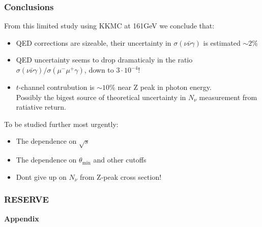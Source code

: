 \documentclass{beamer}
\begin{document}
\begin{frame}[fragile]
\frametitle{\bf Conclusions}
\small
From this limited study using KKMC at 161GeV we conclude that:
\begin{itemize}
\item
QED corrections are sizeable,
their uncertainty in $\sigma(\nu\bar\nu\gamma)$
is estimated $\sim 2\%$ 
\item
QED uncertainty seems to drop dramaticaly in the ratio
$\sigma(\nu\bar\nu\gamma)/\sigma(\mu^-\mu^+\gamma)$,
down to $3\cdot 10^{-4}$!
\item
$t$-channel contrubution is $\sim 10\%$ near Z peak in photon energy.\\
Possibly the bigest source of theoretical uncertainty in $N_\nu$ measurement
from ratiative return.
\end{itemize}

To be studied further most urgently:
\begin{itemize}
\item
The dependence on $\sqrt{s}$
\item
The dependence on $\theta_{\min}$ and other cutoffs
\item
Dont give up on $N_\nu$ from Z-peak cross section!
\end{itemize}

\end{frame}


\begin{frame}[fragile]
\frametitle{\bf RESERVE}
\begin{center}
{\Huge\bf Appendix}
\end{center}
\end{frame}
\end{document}
